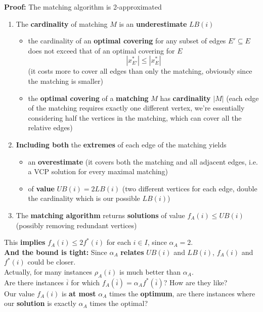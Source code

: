 \textbf{Proof:} The matching algorithm is 2-approximated
\begin{enumerate}
	\item The \textbf{cardinality} of matching $M$ is an \textbf{underestimate} $LB (i )$
	\begin{itemize}
		\item the cardinality of an \textbf{optimal covering} for any subset of edges $E' \subseteq E$ does not exceed that of an optimal covering for $E$
		$$ |x_{E'}^\ast| \leq |x_E^\ast|$$
		(it costs more to cover all edges than only the matching, obviously since the matching is smaller)
		\item the \textbf{optimal covering} of a \textbf{matching} $M$ has \textbf{cardinality} $|M|$ (each edge of the matching requires exactly one different vertex, we're essentially considering half the vertices in the matching, which can cover all the relative edges)
	\end{itemize}
	\item \textbf{Including both} the \textbf{extremes} of each edge of the matching yields
	\begin{itemize}
		\item an \textbf{overestimate} (it covers both the matching and all adjacent edges, i.e. a VCP solution for every maximal matching)
		\item of \textbf{value} $UB (i ) = 2LB (i )$ (two different vertices for each edge, double the cardinality which is our possible $LB (i)$)
	\end{itemize}
	\item The \textbf{matching algorithm} returns \textbf{solutions} of value $f_A (i ) \leq UB (i )$ (possibly removing redundant vertices)
\end{enumerate}
This \textbf{implies} $f_A (i ) \leq 2f^\ast (i )$ for each $i \in I$, since $\alpha_A = 2$.\\

\textbf{And the bound is tight:} Since $\alpha_A$ \textbf{relates} $UB (i )$ and $LB (i )$, $f_A (i )$ and $f^\ast (i )$ could be closer.\\
Actually, for many instances $\rho_A (i )$ is much better than $\alpha_A$.\\

Are there instances $\overline{i}$ for which $f_A (\overline{i}) = \alpha_A f^\ast (\overline{i})$? How are they like? \\
Our value $f_A(i)$ is \textbf{at most} $\alpha_A$ times the \textbf{optimum}, are there instances where our \textbf{solution} is  exactly $\alpha_A$ times the optimal?\\

